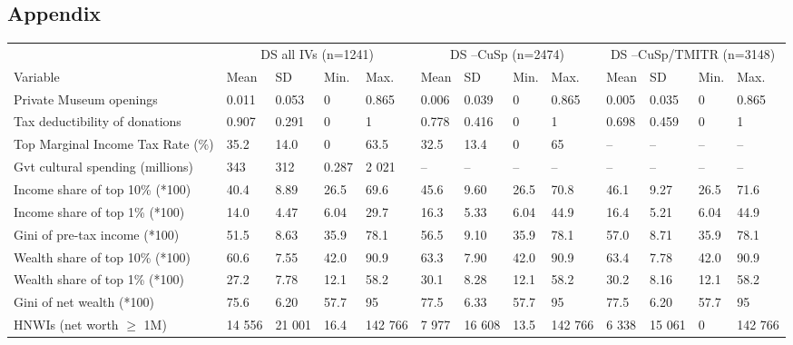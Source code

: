 \documentclass[11pt, authoryear]{elsarticle}
\begin{document}
\subsection*{Appendix}


\begin{landscape}
\begin{table}[ht]
\centering
\begin{tabular}{p{7cm}llllllllllll}
  \hline 
  & \multicolumn{4}{c}{DS all IVs (n=1241)} & \multicolumn{4}{c}{DS --CuSp (n=2474)} & \multicolumn{4}{c}{DS --CuSp/TMITR (n=3148)} \\ 
\cmidrule(r){2-5}\cmidrule(r){6-9}\cmidrule(r){10-13}  
 Variable & Mean & SD & Min. & Max. & Mean & SD & Min. & Max. & Mean & SD & Min. & Max. \\ 
  \hline
Private Museum openings & 0.011 & 0.053 & 0 & 0.865 & 0.006 & 0.039 & 0 & 0.865 & 0.005 & 0.035 & 0 & 0.865 \\ 
  Tax deductibility of donations & 0.907 & 0.291 & 0 & 1 & 0.778 & 0.416 & 0 & 1 & 0.698 & 0.459 & 0 & 1 \\ 
  Top Marginal Income Tax Rate (\%) & 35.2 & 14.0 & 0 & 63.5 & 32.5 & 13.4 & 0 & 65 & -- & -- & -- & -- \\ 
  Gvt cultural spending (millions) & 343 & 312 & 0.287 & 2 021 & -- & -- & -- & -- & -- & -- & -- & -- \\ 
  Income share of top 10\% (*100) & 40.4 & 8.89 & 26.5 & 69.6 & 45.6 & 9.60 & 26.5 & 70.8 & 46.1 & 9.27 & 26.5 & 71.6 \\ 
  Income share of top 1\% (*100) & 14.0 & 4.47 & 6.04 & 29.7 & 16.3 & 5.33 & 6.04 & 44.9 & 16.4 & 5.21 & 6.04 & 44.9 \\ 
  Gini of pre-tax income (*100) & 51.5 & 8.63 & 35.9 & 78.1 & 56.5 & 9.10 & 35.9 & 78.1 & 57.0 & 8.71 & 35.9 & 78.1 \\ 
  Wealth share of top 10\% (*100) & 60.6 & 7.55 & 42.0 & 90.9 & 63.3 & 7.90 & 42.0 & 90.9 & 63.4 & 7.78 & 42.0 & 90.9 \\ 
  Wealth share of top 1\% (*100) & 27.2 & 7.78 & 12.1 & 58.2 & 30.1 & 8.28 & 12.1 & 58.2 & 30.2 & 8.16 & 12.1 & 58.2 \\ 
  Gini of net wealth (*100) & 75.6 & 6.20 & 57.7 & 95 & 77.5 & 6.33 & 57.7 & 95 & 77.5 & 6.20 & 57.7 & 95 \\ 
  HNWIs (net worth $\geq$ 1M) & 14 556 & 21 001 & 16.4 & 142 766 & 7 977 & 16 608 & 13.5 & 142 766 & 6 338 & 15 061 & 0 & 142 766 \\ 

\end{tabular}
\end{table}
\end{landscape}
\end{document}
